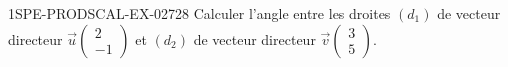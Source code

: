 \begin{exercice}{1SPE-PRODSCAL-EX-027}{2}{8}
Calculer l'angle entre les droites $(d_1)$ de vecteur directeur $\vec{u}\begin{pmatrix} 2 \\ -1 \end{pmatrix}$ et $(d_2)$ de vecteur directeur $\vec{v}\begin{pmatrix} 3 \\ 5 \end{pmatrix}$.
\end{exercice}
